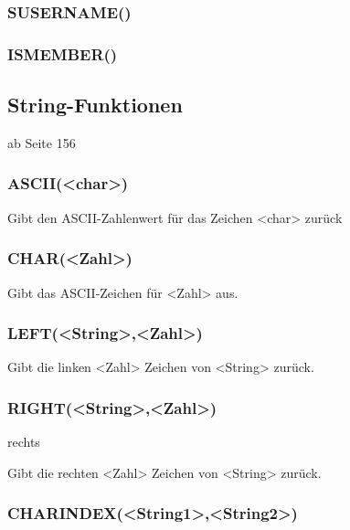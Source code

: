 \documentclass[12pt,ngerman,a4paper,index=totoc,twoside]{scrartcl}
\newcommand{\vari}[1]{\textless#1\textgreater}
\begin{document}
 
\subsubsection{SUSER\textunderscore NAME()} 


\subsubsection{IS\textunderscore MEMBER()} 


 
\subsection{String-Funktionen}

ab Seite 156

\subsubsection{ASCII(\vari{char})}   Gibt den ASCII-Zahlenwert für das Zeichen \vari{char} zurück

\subsubsection{CHAR(\vari{Zahl})}   Gibt das ASCII-Zeichen für \vari{Zahl} aus.

\subsubsection{LEFT(\vari{String},\vari{Zahl})}  

Gibt die linken \vari{Zahl} Zeichen von \vari{String} zurück.

\subsubsection{RIGHT(\vari{String},\vari{Zahl})}  rechts

Gibt die rechten \vari{Zahl} Zeichen von \vari{String} zurück.

\subsubsection{CHARINDEX(\vari{String1},\vari{String2})}    
\end{document}
